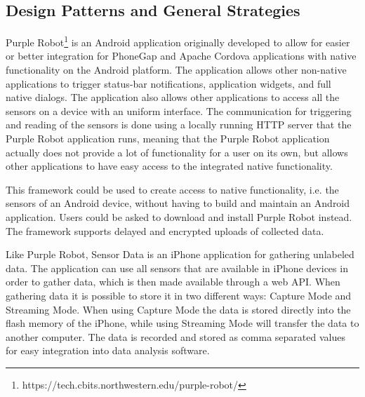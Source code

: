 
\subsection{Design Patterns and General Strategies}
\label{sub:design_patterns_and_general_strategies}

Purple Robot\footnote{https://tech.cbits.northwestern.edu/purple-robot/} is an Android application originally developed to allow for easier or better integration for PhoneGap and Apache Cordova applications with native functionality on the Android platform. The application allows other non-native applications to trigger status-bar notifications, application widgets, and full native dialogs. 
The application also allows other applications to access all the sensors on a device with an uniform interface. 
The communication for triggering and reading of the sensors is done using a locally running HTTP server that the Purple Robot application runs, meaning that the Purple Robot application actually does not provide a lot of functionality for a user on its own, but allows other applications to have easy access to the integrated native functionality.

This framework could be used to create access to native functionality, i.e. the sensors of an Android device, without having to build and maintain an Android application. Users could be asked to download and install Purple Robot instead. The framework supports delayed and encrypted uploads of collected data. 

Like Purple Robot, Sensor Data is an iPhone application for gathering unlabeled data. The application can use all sensors that are available in iPhone devices in order to gather data, which is then made available through a web API. When gathering data it is possible to store it in two different ways: Capture Mode and Streaming Mode. When using Capture Mode the data is stored directly into the flash memory of the iPhone, while using Streaming Mode will transfer the data to another computer. The data is recorded and stored as comma separated values for easy integration into data analysis software.

